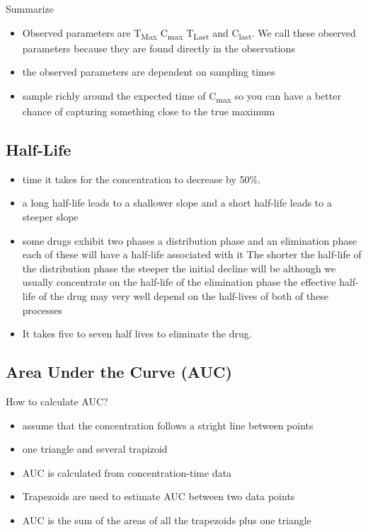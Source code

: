\documentclass[
  letterpaper,
  DIV=11,
  numbers=noendperiod]{scrreprt}
\providecommand{\tightlist}{%
  \setlength{\itemsep}{0pt}\setlength{\parskip}{0pt}}\usepackage{longtable,booktabs,array}
\begin{document}
Summarize

\begin{itemize}
\tightlist
\item
  Observed parameters are T\textsubscript{Max} C\textsubscript{max}
  T\textsubscript{Last} and C\textsubscript{last}. We call these
  observed parameters because they are found directly in the
  observations
\item
  the observed parameters are dependent on sampling times
\item
  sample richly around the expected time of C\textsubscript{max} so you
  can have a better chance of capturing something close to the true
  maximum
\end{itemize}

\hypertarget{half-life}{%
\subsection{Half-Life}\label{half-life}}

\begin{itemize}
\item
  time it takes for the concentration to decrease by 50\%.
\item
  a long half-life leads to a shallower slope and a short half-life
  leads to a steeper slope
\item
  some drugs exhibit two phases a distribution phase and an elimination
  phase each of these will have a half-life associated with it The
  shorter the half-life of the distribution phase the steeper the
  initial decline will be although we usually concentrate on the
  half-life of the elimination phase the effective half-life of the drug
  may very well depend on the half-lives of both of these processes
\item
  It takes five to seven half lives to eliminate the drug.
\end{itemize}

\hypertarget{area-under-the-curve-auc}{%
\subsection{Area Under the Curve (AUC)}\label{area-under-the-curve-auc}}

How to calculate AUC?

\begin{itemize}
\item
  assume that the concentration follows a stright line between points
\item
  one triangle and several trapizoid
\item
  AUC is calculated from concentration-time data
\item
  Trapezoids are used to estimate AUC between two data points
\item
  AUC is the sum of the areas of all the trapezoids plus one triangle
\end{itemize}
\end{document}
